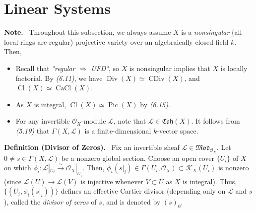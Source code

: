 \documentclass[11pt,a4paper,footinclude=true,headinclude=true]{scrbook} %
\DeclareMathOperator{\CDiv}{CDiv}
\DeclareMathOperator{\Div}{Div}
\DeclareMathOperator{\Pic}{Pic}
\DeclareMathOperator{\Cl}{Cl}
\DeclareMathOperator{\CaCl}{CaCl}
\newcommand{\KK}{\mathscr{K}}
\newcommand{\LL}{\mathscr{L}}
\newcommand{\OO}{\mathcal{O}}
\newcommand{\<}{\langle}
\newcommand{\>}{\rangle}
\newcommand{\isoto}{\overset{\sim}{\to}}
\newcommand{\MOD}{\mathfrak{Mod}}
\newcommand{\coh}{\mathfrak{Coh}}
\newenvironment{definition}[2][Definition]
    { \begin{mdframed}[backgroundcolor=gray!20] \textbf{#1 #2.}\ }
    {  \end{mdframed}}
\newenvironment{nt}[2][Note]
    { \begin{mdframed}[backgroundcolor=gray!20] \textbf{#1.}\ }
    {  \end{mdframed}}
\begin{document}
\newpage
\section{Linear Systems}
\begin{nt}{}
    Throughout this subsection, we always assume $X$ is a \textit{nonsingular} (all local rings are regular) projective variety over an algebraically closed field $k$. Then,
    \begin{itemize}
        \item Recall that \textit{"regular $\Rightarrow$ UFD"}, so $X$ is nonsingular implies that $X$ is locally factorial. By \textit{(6.11)}, we have $\Div(X)\simeq\CDiv(X)$, and $\Cl(X)\simeq\CaCl(X)$.
        \item As $X$ is integral, $\Cl(X)\simeq\Pic(X)$ by \textit{(6.15)}.
        \item For any invertible $\OO_X$-module $\LL$, note that $\LL\in\coh(X)$. It follows from \textit{(5.19)} that $\Gamma(X,\LL)$ is a finite-dimensional $k$-vector space.
    \end{itemize}
\end{nt}

\begin{definition}{(Divisor of Zeros)}
    Fix an invertible sheaf $\LL\in\MOD_{\OO_X}$. Let $0\neq s\in\Gamma(X,\LL)$ be a nonzero global section. Choose an open cover $\{U_i\}$ of $X$ on which $\phi_i:\LL|_{U_i}\isoto\OO_X|_{U_i}$. Then, $\phi_i(s|_i)\in\Gamma(U_i,\OO_X)\subset\KK_X(U_i)$ is nonzero (since $\LL(U)\to\LL(V)$ is injective whenever $V\subset U$ as $X$ is integral). Thus, $\{(U_i,\phi_i(s|_i))\}$ defines an effective Cartier divisor (depending only on $\LL$ and $s$), called the \textit{divisor of zeros} of $s$, and is denoted by $(s)_0$.
\end{definition}
\end{document}
